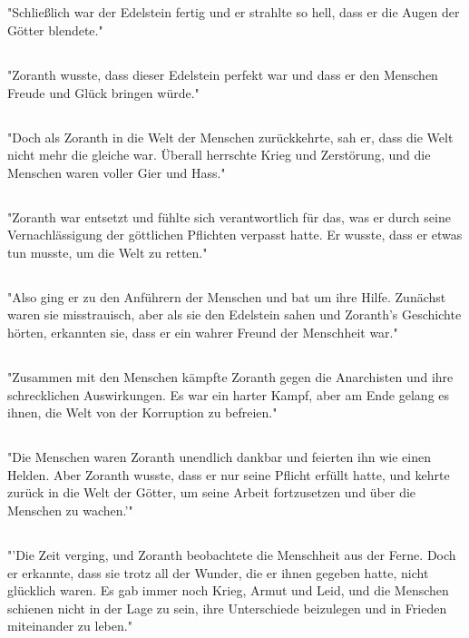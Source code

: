 \documentclass{article}
\begin{document}
\subsection{}
"Schließlich war der Edelstein fertig und er strahlte so hell, dass er die Augen der Götter blendete."
\subsection{}
"Zoranth wusste, dass dieser Edelstein perfekt war und dass er den Menschen Freude und Glück bringen würde."
\subsection{}
"Doch als Zoranth in die Welt der Menschen zurückkehrte, sah er, dass die Welt nicht mehr die gleiche war. Überall herrschte Krieg und Zerstörung, und die Menschen waren voller Gier und Hass."
\subsection{}
"Zoranth war entsetzt und fühlte sich verantwortlich für das, was er durch seine Vernachlässigung der göttlichen Pflichten verpasst hatte. Er wusste, dass er etwas tun musste, um die Welt zu retten."
\subsection{}
"Also ging er zu den Anführern der Menschen und bat um ihre Hilfe. Zunächst waren sie misstrauisch, aber als sie den Edelstein sahen und Zoranth's Geschichte hörten, erkannten sie, dass er ein wahrer Freund der Menschheit war."
\subsection{}
"Zusammen mit den Menschen kämpfte Zoranth gegen die Anarchisten und ihre schrecklichen Auswirkungen. Es war ein harter Kampf, aber am Ende gelang es ihnen, die Welt von der Korruption zu befreien."
\subsection{}
"Die Menschen waren Zoranth unendlich dankbar und feierten ihn wie einen Helden. Aber Zoranth wusste, dass er nur seine Pflicht erfüllt hatte, und kehrte zurück in die Welt der Götter, um seine Arbeit fortzusetzen und über die Menschen zu wachen.'"
\subsection{}
"'Die Zeit verging, und Zoranth beobachtete die Menschheit aus der Ferne. Doch er erkannte, dass sie trotz all der Wunder, die er ihnen gegeben hatte, nicht glücklich waren. Es gab immer noch Krieg, Armut und Leid, und die Menschen schienen nicht in der Lage zu sein, ihre Unterschiede beizulegen und in Frieden miteinander zu leben."
\end{document}
